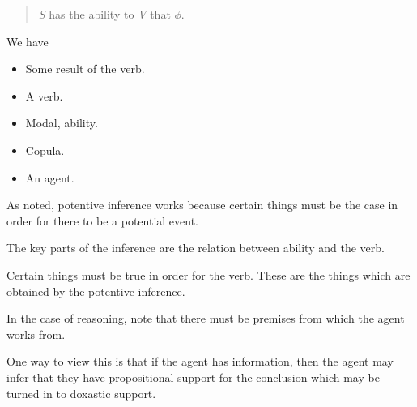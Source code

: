 \begin{note}
  \begin{quote}
    \emph{S} has the ability to \emph{V} that \(\phi\).
  \end{quote}
  We have
  \begin{itemize}
  \item Some result of the verb.
  \item A verb.
  \item Modal, ability.
  \item Copula.
  \item An agent.
  \end{itemize}
  As noted, potentive inference works because certain things must be the case in order for there to be a potential event.
\end{note}

\begin{note}
  The key parts of the inference are the relation between ability and the verb.

  Certain things must be true in order for the verb.
  These are the things which are obtained by the potentive inference.

  In the case of reasoning, note that there must be premises from which the agent works from.
\end{note}

\begin{note}
  One way to view this is that if the agent has information, then the agent may infer that they have propositional support for the conclusion which may be turned in to doxastic support.
\end{note}

